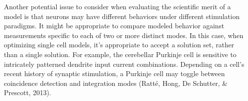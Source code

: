 Another potential issue to consider when evaluating the scientific merit of a model is that neurons may have different behaviors under different stimulation paradigms. It might be appropriate to compare modeled behavior against measurements specific to each of two or more distinct modes. In this case, when optimizing single cell models, it’s appropriate to accept a solution set, rather than a single solution. For example, the cerebellar Purkinje cell is sensitive to intricately patterned dendrite input current combinations. Depending on a cell’s recent history of synaptic stimulation, a Purkinje cell may toggle between coincidence detection and integration modes (Ratté, Hong, De Schutter, \& Prescott, 2013).
\\

